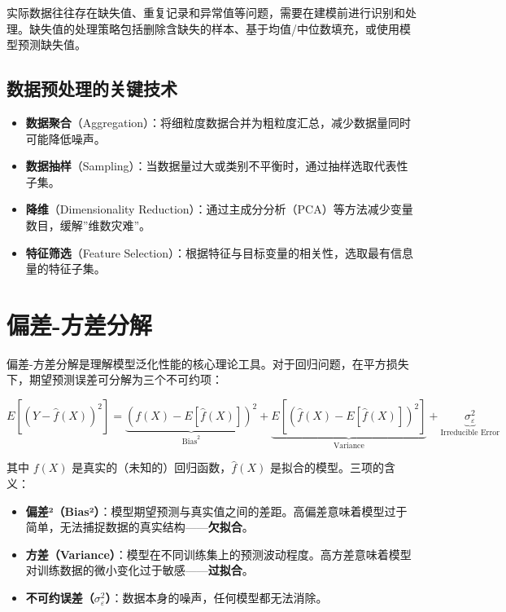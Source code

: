 \documentclass[
]{book}
\providecommand{\tightlist}{%
  \setlength{\itemsep}{0pt}\setlength{\parskip}{0pt}}
\begin{document}
实际数据往往存在缺失值、重复记录和异常值等问题，需要在建模前进行识别和处理。缺失值的处理策略包括删除含缺失的样本、基于均值/中位数填充，或使用模型预测缺失值。

\subsection{数据预处理的关键技术}\label{ux6570ux636eux9884ux5904ux7406ux7684ux5173ux952eux6280ux672f}

\begin{itemize}
\tightlist
\item
  \textbf{数据聚合}（Aggregation）：将细粒度数据合并为粗粒度汇总，减少数据量同时可能降低噪声。
\item
  \textbf{数据抽样}（Sampling）：当数据量过大或类别不平衡时，通过抽样选取代表性子集。
\item
  \textbf{降维}（Dimensionality Reduction）：通过主成分分析（PCA）等方法减少变量数目，缓解''维数灾难''。
\item
  \textbf{特征筛选}（Feature Selection）：根据特征与目标变量的相关性，选取最有信息量的特征子集。
\end{itemize}

\section{偏差-方差分解}\label{ux504fux5dee-ux65b9ux5deeux5206ux89e3}

偏差-方差分解是理解模型泛化性能的核心理论工具。对于回归问题，在平方损失下，期望预测误差可分解为三个不可约项：

\[
E[(Y - \hat{f}(X))^2] = \underbrace{(f(X) - E[\hat{f}(X)])^2}_{\text{Bias}^2} + \underbrace{E[(\hat{f}(X) - E[\hat{f}(X)])^2]}_{\text{Variance}} + \underbrace{\sigma^2_{\varepsilon}}_{\text{Irreducible Error}}
\]

其中 \(f(X)\) 是真实的（未知的）回归函数，\(\hat{f}(X)\) 是拟合的模型。三项的含义：

\begin{itemize}
\tightlist
\item
  \textbf{偏差²（Bias²）}：模型期望预测与真实值之间的差距。高偏差意味着模型过于简单，无法捕捉数据的真实结构------\textbf{欠拟合}。
\item
  \textbf{方差（Variance）}：模型在不同训练集上的预测波动程度。高方差意味着模型对训练数据的微小变化过于敏感------\textbf{过拟合}。
\item
  \textbf{不可约误差（\(\sigma^2_{\varepsilon}\)）}：数据本身的噪声，任何模型都无法消除。
\end{itemize}
\end{document}
